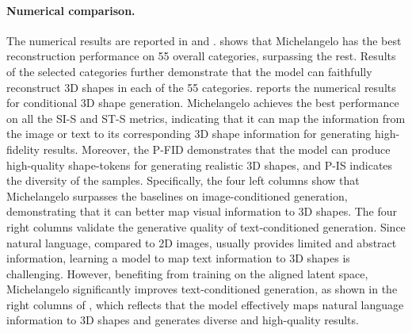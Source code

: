 \documentclass[../../book-main.tex]{subfiles}
\begin{document}
\paragraph{Numerical comparison.}
The numerical results are reported in
 and .
 shows that Michelangelo has the
best reconstruction performance on 55 overall categories, surpassing
the rest.
Results of the selected categories further demonstrate that
the model can faithfully reconstruct 3D shapes in each of the 55 categories.
 reports the numerical results for
conditional 3D shape generation.
Michelangelo achieves the best performance on all the SI-S and ST-S
metrics, indicating that it can map the information from the image or
text to its corresponding 3D shape information for generating
high-fidelity results.
Moreover, the P-FID demonstrates that the
model can produce high-quality shape-tokens for generating realistic
3D shapes, and P-IS indicates the diversity of the samples.
Specifically, the four left columns show that Michelangelo surpasses
the baselines on image-conditioned generation, demonstrating that it
can better map visual information to 3D shapes.
The four right columns validate the generative quality of
text-conditioned generation.
Since natural language, compared to 2D
images, usually provides limited and abstract information, learning a
model to map text information to 3D shapes is challenging.
However,
benefiting from training on the aligned latent space, Michelangelo
significantly improves text-conditioned generation, as shown in the
right columns of , which reflects
that the model effectively maps natural language information to 3D
shapes and generates diverse and high-quality results.
\end{document}
